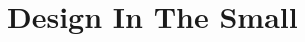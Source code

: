 \documentclass[../DD.tex]{subfiles}
\begin{document}
\chapter{Design In The Small}
\thispagestyle{fancy}
		
		
				
\end{document}
